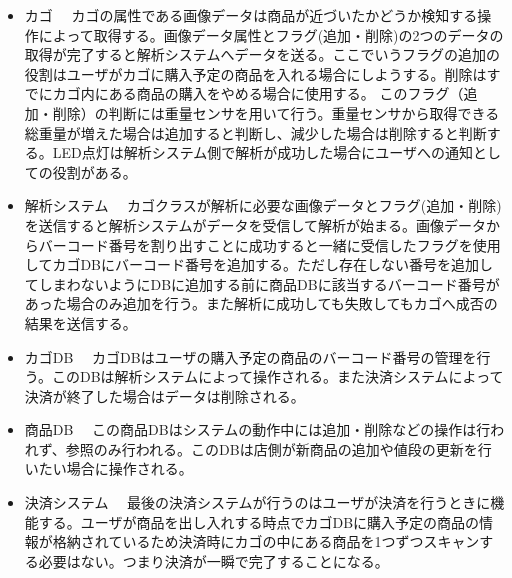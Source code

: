 \begin{itemize}
\item カゴ
　カゴの属性である画像データは商品が近づいたかどうか検知する操作によって取得する。画像データ属性とフラグ(追加・削除)の2つのデータの取得が完了すると解析システムへデータを送る。ここでいうフラグの追加の役割はユーザがカゴに購入予定の商品を入れる場合にしようする。削除はすでにカゴ内にある商品の購入をやめる場合に使用する。
このフラグ（追加・削除）の判断には重量センサを用いて行う。重量センサから取得できる総重量が増えた場合は追加すると判断し、減少した場合は削除すると判断する。LED点灯は解析システム側で解析が成功した場合にユーザへの通知としての役割がある。
\item 解析システム
　カゴクラスが解析に必要な画像データとフラグ(追加・削除)を送信すると解析システムがデータを受信して解析が始まる。画像データからバーコード番号を割り出すことに成功すると一緒に受信したフラグを使用してカゴDBにバーコード番号を追加する。ただし存在しない番号を追加してしまわないようにDBに追加する前に商品DBに該当するバーコード番号があった場合のみ追加を行う。また解析に成功しても失敗してもカゴへ成否の結果を送信する。
\item カゴDB
　カゴDBはユーザの購入予定の商品のバーコード番号の管理を行う。このDBは解析システムによって操作される。また決済システムによって決済が終了した場合はデータは削除される。
\item 商品DB
　この商品DBはシステムの動作中には追加・削除などの操作は行われず、参照のみ行われる。このDBは店側が新商品の追加や値段の更新を行いたい場合に操作される。
\item 決済システム
　最後の決済システムが行うのはユーザが決済を行うときに機能する。ユーザが商品を出し入れする時点でカゴDBに購入予定の商品の情報が格納されているため決済時にカゴの中にある商品を1つずつスキャンする必要はない。つまり決済が一瞬で完了することになる。
\end{itemize}